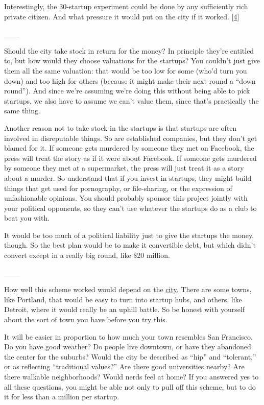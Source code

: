 Interestingly, the 30-startup experiment could be done by any
sufficiently rich private citizen. And what pressure it would put on the
city if it worked. {[}\hyperref[f4n]{4}{]}

\_\_\_

Should the city take stock in return for the money? In principle they're
entitled to, but how would they choose valuations for the startups? You
couldn't just give them all the same valuation: that would be too low
for some (who'd turn you down) and too high for others (because it might
make their next round a ``down round''). And since we're assuming we're
doing this without being able to pick startups, we also have to assume
we can't value them, since that's practically the same thing.

Another reason not to take stock in the startups is that startups are
often involved in disreputable things. So are established companies, but
they don't get blamed for it. If someone gets murdered by someone they
met on Facebook, the press will treat the story as if it were about
Facebook. If someone gets murdered by someone they met at a supermarket,
the press will just treat it as a story about a murder. So understand
that if you invest in startups, they might build things that get used
for pornography, or file-sharing, or the expression of unfashionable
opinions. You should probably sponsor this project jointly with your
political opponents, so they can't use whatever the startups do as a
club to beat you with.

It would be too much of a political liability just to give the startups
the money, though. So the best plan would be to make it convertible
debt, but which didn't convert except in a really big round, like \$20
million.

\_\_\_

How well this scheme worked would depend on the
\href{cities.html}{city}. There are some towns, like Portland, that
would be easy to turn into startup hubs, and others, like Detroit, where
it would really be an uphill battle. So be honest with yourself about
the sort of town you have before you try this.

It will be easier in proportion to how much your town resembles San
Francisco. Do you have good weather? Do people live downtown, or have
they abandoned the center for the suburbs? Would the city be described
as ``hip'' and ``tolerant,'' or as reflecting ``traditional values?''
Are there good universities nearby? Are there walkable neighborhoods?
Would nerds feel at home? If you answered yes to all these questions,
you might be able not only to pull off this scheme, but to do it for
less than a million per startup.

